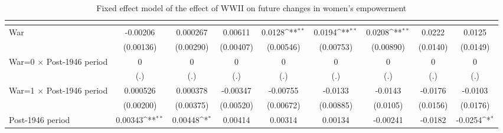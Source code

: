 \begin{table}[htbp]\centering
\def\sym#1{\ifmmode^{#1}\else\(^{#1}\)\fi}
\caption{Fixed effect model of the effect of WWII on future changes in women's empowerment \label{fepolemwwII}}
\begin{tabular}{l*{8}{c}}
\hline\hline
                    &&&&&&&&\\
\hline
War                 &    -0.00206         &    0.000267         &     0.00611         &      0.0128\sym{**} &      0.0194\sym{**} &      0.0208\sym{**} &      0.0222         &      0.0125         \\
                    &   (0.00136)         &   (0.00290)         &   (0.00407)         &   (0.00546)         &   (0.00753)         &   (0.00890)         &    (0.0140)         &    (0.0149)         \\
[1em]
War=0 $\times$ Post-1946 period&           0         &           0         &           0         &           0         &           0         &           0         &           0         &           0         \\
                    &         (.)         &         (.)         &         (.)         &         (.)         &         (.)         &         (.)         &         (.)         &         (.)         \\
[1em]
War=1 $\times$ Post-1946 period&    0.000526         &    0.000378         &    -0.00347         &    -0.00755         &     -0.0133         &     -0.0143         &     -0.0176         &     -0.0103         \\
                    &   (0.00200)         &   (0.00375)         &   (0.00520)         &   (0.00672)         &   (0.00885)         &    (0.0105)         &    (0.0156)         &    (0.0176)         \\
[1em]
Post-1946 period    &     0.00343\sym{**} &     0.00448\sym{*}  &     0.00414         &     0.00314         &     0.00134         &    -0.00241         &     -0.0182         &     -0.0254\sym{*}  \\

\end{tabular}
\end{table}

